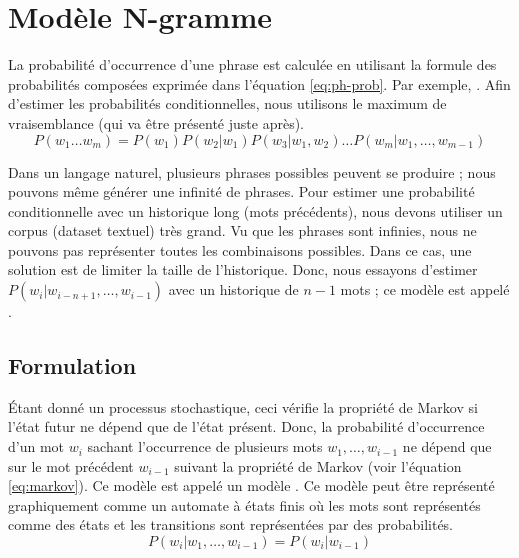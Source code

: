 \documentclass{KodeBook}
\begin{document}
\section{Modèle N-gramme}

La probabilité d'occurrence d'une phrase est calculée en utilisant la formule des probabilités composées exprimée dans l'équation \ref{eq:ph-prob}.
Par exemple, .
Afin d'estimer les probabilités conditionnelles, nous utilisons le maximum de vraisemblance (qui va être présenté juste après).
\begin{equation}\label{eq:ph-prob}
	P(w_1 \ldots w_m) =  P(w_1) P(w_2 | w_1) P(w_3 | w_1, w_2) \ldots P(w_m | w_1, \ldots, w_{m-1})
\end{equation}

Dans un langage naturel, plusieurs phrases possibles peuvent se produire ; nous pouvons même générer une infinité de phrases.
Pour estimer une probabilité conditionnelle avec un historique long (mots précédents), nous devons utiliser un corpus (dataset textuel) très grand. 
Vu que les phrases sont infinies, nous ne pouvons pas représenter toutes les combinaisons possibles. 
Dans ce cas, une solution est de limiter la taille de l'historique. 
Donc, nous essayons d'estimer $P(w_i|w_{i-n+1},\ldots,w_{i-1})$ avec un historique de $n-1$ mots ; 
ce modèle est appelé .

\subsection{Formulation}

Étant donné un processus stochastique, ceci vérifie la propriété de Markov si l'état futur ne dépend que de l'état présent. 
Donc, la probabilité d'occurrence d'un mot $w_i$ sachant l'occurrence de plusieurs mots $w_1, \ldots, w_{i-1}$ ne dépend que sur le mot précédent $w_{i-1}$ suivant la propriété de Markov (voir l'équation \ref{eq:markov}). 
Ce modèle est appelé un modèle .
Ce modèle peut être représenté graphiquement comme un automate à états finis où les mots sont représentés comme des états et les transitions sont représentées par des probabilités.
\begin{equation}
	P(w_i | w_1,\ldots, w_{i-1}) = P(w_i | w_{i-1})
	\label{eq:markov}
\end{equation}
\end{document}

